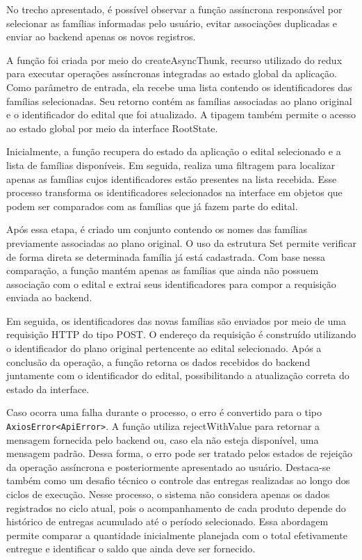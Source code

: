No trecho apresentado, é possível observar a função assíncrona responsável por selecionar as famílias informadas pelo usuário, evitar associações duplicadas e enviar ao backend apenas os novos registros.

A função foi criada por meio do createAsyncThunk, recurso utilizado do redux para executar operações assíncronas integradas ao estado global da aplicação. Como parâmetro de entrada, ela recebe uma lista contendo os identificadores das famílias selecionadas. Seu retorno contém as famílias associadas ao plano original e o identificador do edital que foi atualizado. A tipagem também permite o acesso ao estado global por meio da interface RootState.

Inicialmente, a função recupera do estado da aplicação o edital selecionado e a lista de famílias disponíveis. Em seguida, realiza uma filtragem para localizar apenas as famílias cujos identificadores estão presentes na lista recebida. Esse processo transforma os identificadores selecionados na interface em objetos que podem ser comparados com as famílias que já fazem parte do edital.

Após essa etapa, é criado um conjunto contendo os nomes das famílias previamente associadas ao plano original. O uso da estrutura Set permite verificar de forma direta se determinada família já está cadastrada. Com base nessa comparação, a função mantém apenas as famílias que ainda não possuem associação com o edital e extrai seus identificadores para compor a requisição enviada ao backend.

Em seguida, os identificadores das novas famílias são enviados por meio de uma requisição HTTP do tipo POST. O endereço da requisição é construído utilizando o identificador do plano original pertencente ao edital selecionado. Após a conclusão da operação, a função retorna os dados recebidos do backend juntamente com o identificador do edital, possibilitando a atualização correta do estado da interface.

Caso ocorra uma falha durante o processo, o erro é convertido para o tipo \verb|AxiosError<ApiError>|. A função utiliza rejectWithValue para retornar a mensagem fornecida pelo backend ou, caso ela não esteja disponível, uma mensagem padrão. Dessa forma, o erro pode ser tratado pelos estados de rejeição da operação assíncrona e posteriormente apresentado ao usuário.
Destaca-se também como um desafio técnico o controle das entregas realizadas ao longo dos ciclos de execução. Nesse processo, o sistema não considera apenas os dados registrados no ciclo atual, pois o acompanhamento de cada produto depende do histórico de entregas acumulado até o período selecionado. Essa abordagem permite comparar a quantidade inicialmente planejada com o total efetivamente entregue e identificar o saldo que ainda deve ser fornecido.

